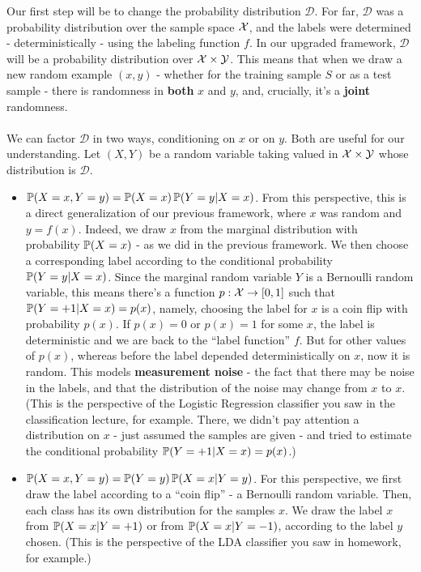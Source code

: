\documentclass[11pt]{article}
\newcommand{\Dc}{\mathcal{D}}
\begin{document}
  Our first step will be to change the probability distribution $\Dc$. For far,
  $\Dc$ was a probability distribution over the sample space $\mathcal{X}$, and the
  labels were determined - deterministically - using the labeling function $f$.
  In our upgraded framework, $\Dc$ will be a probability distribution over
  $\mathcal{X}\times \mathcal{Y}$. This means that when we draw a new random example $(x,y)$ - whether for
  the training sample $S$ or as a test sample - there is randomness in {\bf
  both} $x$ and $y$, and, crucially, it's a {\bf joint} randomness. 
  \\~\\
  We can factor $\Dc$ in two ways, conditioning on $x$ or on $y$. Both are useful for our understanding.
  Let $(X,Y)$ be a random variable taking valued in $\mathcal{X}\times \mathcal{Y}$ whose
  distribution is $\Dc$. 
\begin{itemize}
  \item $\operatorname*{\mathbb{P}}(X=x,Y=y)=\operatorname*{\mathbb{P}}(X=x)\operatorname*{\mathbb{P}}(Y=y|X=x)$. From this perspective, this is a direct
    generalization of our previous framework, where $x$ was random and $y=f(x)$.
    Indeed, we draw $x$ from the marginal distribution with probability
    $\operatorname*{\mathbb{P}}(X=x)$ - as we did in the previous framework. We then choose a corresponding 
    label according to the conditional probability $\operatorname*{\mathbb{P}}(Y=y|X=x)$. Since the
    marginal random variable $Y$ is a Bernoulli random variable, this means
    there's a function $p:\mathcal{X}\to[0,1]$ such that $\operatorname*{\mathbb{P}}(Y=+1|X=x)=p(x)$, namely,
    choosing the label for $x$ is a coin flip with probability $p(x)$. If
    $p(x)=0$ or $p(x)=1$ for some $x$, the label is deterministic and we are
    back to the ``label function'' $f$. But for other values of $p(x)$, whereas
    before the label depended deterministically on $x$, now it is random.
    This models {\bf measurement noise} - the fact that there may be noise in
    the labels, and that the distribution of the noise may change from $x$ to $x$. 
    (This is the perspective of the Logistic Regression classifier you saw in
    the classification lecture, for example. There, we didn't pay attention a
  distribution on $x$ - just assumed the samples are given - and tried to
estimate the conditional probability $\operatorname*{\mathbb{P}}(Y=+1|X=x)=p(x)$.)
  \item $\operatorname*{\mathbb{P}}(X=x,Y=y)=\operatorname*{\mathbb{P}}(Y=y)\operatorname*{\mathbb{P}}(X=x|Y=y)$. For this perspective, we
    first draw the label according to a ``coin flip'' -  a Bernoulli random
    variable. Then, each class has its own distribution for the samples $x$. We
    draw the label $x$ from $\operatorname*{\mathbb{P}}(X=x|Y=+1)$ or from $\operatorname*{\mathbb{P}}(X=x|Y=-1)$, according
    to the label $y$ chosen. (This is the perspective of the LDA classifier you
    saw in homework, for example.) 
\end{itemize}
  
\end{document}
